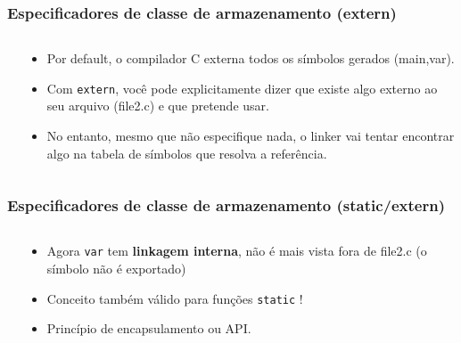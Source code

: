 \documentclass{beamer}
\begin{document}
\begin{frame}
	\frametitle{Especificadores de classe de armazenamento (extern)}
	\begin{columns}[T] %
		\begin{column}{.57\textwidth}
			
			
		\end{column}%
		\hfill%
		\begin{column}{.43\textwidth}
			\begin{itemize}
				\item Por default, o compilador C externa todos os símbolos gerados (main,var).
				\item Com \texttt{extern}, você pode explicitamente dizer que existe algo externo ao seu arquivo (file2.c) e que pretende usar.
			\item No entanto, mesmo que não especifique nada, o linker vai tentar encontrar algo na tabela de símbolos que resolva a referência.
			\end{itemize}
		\end{column}%
	\end{columns}
\end{frame}

\begin{frame}
	\frametitle{Especificadores de classe de armazenamento (static/extern)}
	\begin{columns}[T] %
		\begin{column}{.57\textwidth}
			
			
			
		\end{column}%
		\hfill%
		\begin{column}{.43\textwidth}
			\begin{itemize}
				\item Agora \texttt{var} tem \textbf{linkagem interna}, não é mais vista fora de file2.c (o símbolo não é exportado)
				\item Conceito também válido para funções \texttt{static} !
				\item Princípio de encapsulamento ou API.
			\end{itemize}
		\end{column}%
	\end{columns}
\end{frame}
\end{document}
